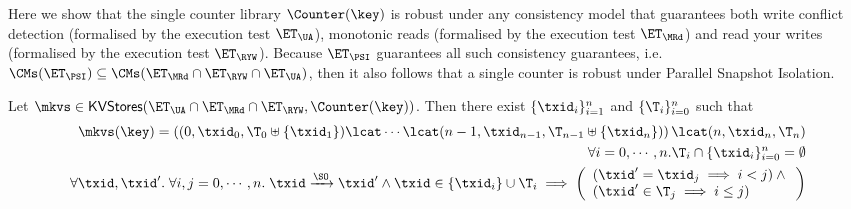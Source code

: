 Here we show that the  single counter library $\Counter(\key)$ is robust under any consistency model 
that guarantees both write conflict detection (formalised by the execution test 
$\ET_{\UA}$), monotonic reads (formalised by the execution test $\ET_{\MRd}$) 
and read your writes (formalised by the execution test $\ET_{\RYW}$). 
Because $\ET_{\PSI}$ guarantees all such consistency guarantees, i.e. 
$\CMs(\ET_{\PSI}) \subseteq \CMs(\ET_{\MRd} \cap \ET_{\RYW} \cap \ET_{\UA})$, 
then it also follows that a single counter is robust under Parallel Snapshot Isolation.
\begin{proposition}
\label{prop:counter_hhshape}
Let $\mkvs \in \mathsf{KVStores}(\ET_{\UA} \cap \ET_{\MRd} \cap \ET_{\RYW}, \Counter(\key))$. 
Then there exist $\{\txid_i\}_{i = 1}^{n}$ and $\{\T_{i}\}_{i = 0}^{n}$ such that 
\begin{align}
\mkvs(\key) = \left( (0, \txid_{0}, \T_{0} \uplus \{\txid_1\}) \lcat \cdots \lcat (n-1, \txid_{n-1}, \T_{n-1} \uplus \{\txid_{n}\}) \right) 
\lcat (n, \txid_{n}, \T_{n}) \label{eq:psi_counter_shape}\\
\forall i=0,\cdots,n.\T_{i} \cap \{\txid_{i}\}_{i=0}^{n} = \emptyset \label{eq:psi_counter_rwtxs}\\
\forall \txid, \txid'.\;\forall i,j=0,\cdots, n.\; \txid \xrightarrow{\SO} \txid' 
\wedge \txid \in \{\txid_{i}\} \cup \T_{i} \implies 
\left(\begin{array}{l}
(\txid' = \txid_{j} \implies i < j) \wedge {} \\
(\txid' \in \T_{j} \implies i \leq j) \\
\end{array}\right) \label{eq:psi_counter_so}
\end{align}
%
%
%
\end{proposition}

